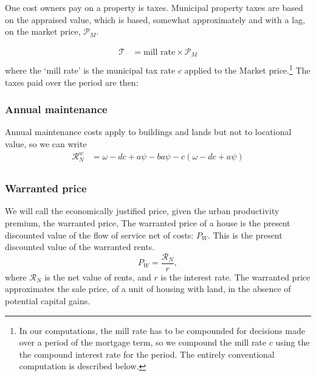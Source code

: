 One cost owners pay on a property is taxes. Municipal property taxes are based on the \gls{appraised value}, which is based, somewhat approximately and with a lag, on the \gls{market price}, $\mathcal{P}_M$. %

\begin{align*}
\mathcal{T} &= \text{mill rate} \times \mathcal{P}_M \\
\end{align*}
where the `\gls{mill rate}' is the municipal tax rate $c$ applied to the Market price.\footnote{In our computations, the mill rate  has to be compounded for decisions made over a period of the mortgage term, so we compound the mill rate $c$ using the the \gls{compound interest rate} for the period. The entirely conventional  computation is described below.} The taxes paid over the period are then:

\subsubsection{Annual maintenance}
Annual maintenance costs apply to buildings and lands but not to locational value,
so we can write
 \begin{align}
\mathcal{R}_N^w &= \omega - {dc}  + a\psi -   ba\psi - c(\omega-{dc}+a\psi) \\
\end{align}

\subsubsection{Warranted price} \label{section-warranted-price}

We will call the economically justified price, given the urban productivity premium, the \gls{warranted price}, 
The \gls{warranted price} of a house is the present discounted value of the flow of service net of costs: $P_W$. This is the present discounted value of the warranted rents.
\begin{equation}
  P_W=\frac{\mathcal{R}_N}{r},  
\label{eqn-price-warranted}
\end{equation}
where $\mathcal{R}_N$ is the net value of rents, and $r$ is the interest rate.  The warranted price approximates the sale price, of a unit of housing with land, in the absence of potential capital gains. 


